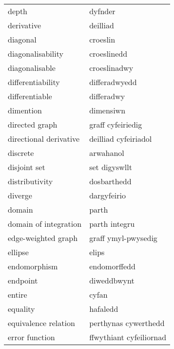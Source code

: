 \begin{supertabular}{p{0.22\textwidth}p{0.22\textwidth}}
                            depth &                          dyfnder \\
                       derivative &                         deilliad \\
                         diagonal &                         croeslin \\
                diagonalisability &                      croeslinedd \\
                   diagonalisable &                     croeslinadwy \\
                differentiability &                    differadwyedd \\
                   differentiable &                       differadwy \\
                        dimention &                        dimensiwn \\
                   directed graph &                graff cyfeiriedig \\
           directional derivative &             deilliad cyfeiriadol \\
                         discrete &                        arwahanol \\
                     disjoint set &                    set digyswllt \\
                   distributivity &                      dosbarthedd \\
                          diverge &                      dargyfeirio \\
                           domain &                            parth \\
            domain of integration &                    parth integru \\
              edge-weighted graph &              graff ymyl-pwysedig \\
                          ellipse &                            elips \\
                     endomorphism &                     endomorffedd \\
                         endpoint &                      diweddbwynt \\
                           entire &                            cyfan \\
                         equality &                         hafaledd \\
             equivalence relation &             perthynas cywerthedd \\
                   error function &          ffwythiant cyfeiliornad \\

\end{supertabular}
